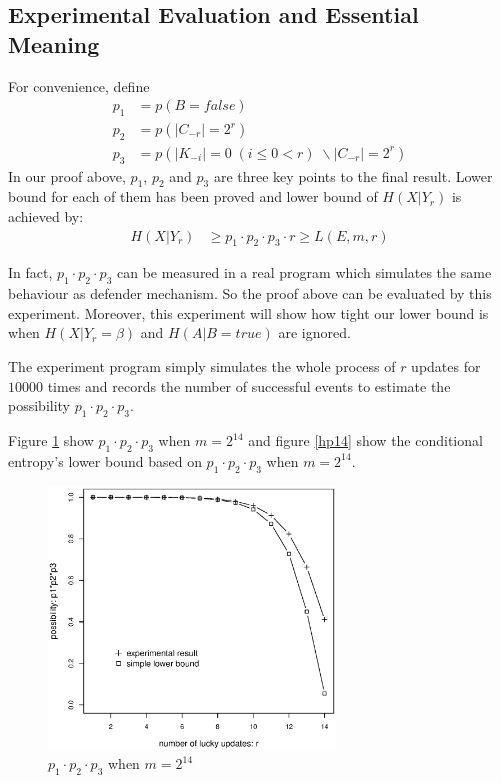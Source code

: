 \documentclass[10pt, conference, compsocconf]{IEEEtran}
\begin{document}
    \subsection{Experimental Evaluation and Essential Meaning}
        For convenience, define
        \begin{align*}
         p_1 &= p(B = false)\\
         p_2 &= p(|C_{-r}| = 2^r)\\
         p_3 &= p(|K_{-i}| = 0 \; (i \leq 0 < r) \; \backslash |C_{-r}| = 2^r)
        \end{align*}
        In our proof above, $p_1$,
        $p_2$ and $p_3$ are
        three key points to the final result.
        Lower bound for each of them has been proved
        and lower bound of $H(X | Y_r)$ is achieved by:
        \begin{align*}
            H(X | Y_r) &\geq p_1 \cdot p_2 \cdot p_3 \cdot r
                \geq L(E, m, r)
        \end{align*}

        In fact, $p_1 \cdot p_2 \cdot p_3$ can be measured in a real program which
        simulates the same behaviour as defender mechanism.
        So the proof above can be evaluated by this experiment.
        Moreover, this experiment will show how tight our lower bound is
        when $H(X | Y_r = \beta)$ and $H(A | B = true)$ are ignored.

        The experiment program simply simulates the whole process of $r$ updates
        for $10000$ times and records the number of successful events
        to estimate the possibility $p_1 \cdot p_2 \cdot p_3$.

        Figure \ref{p14} show $p_1 \cdot p_2 \cdot p_3$
        when $m = 2^{14}$ and figure \ref{hp14} show the conditional entropy's
        lower bound based on $p_1 \cdot p_2 \cdot p_3$ when $m = 2^{14}$.

%
        \begin{figure}[!t]
        \centering
        \includegraphics[width=3in, trim=0mm 0mm 0mm 20mm]{p14.eps}
        \caption{$p_1 \cdot p_2 \cdot p_3$ when $m = 2^{14}$}\label{p14}
        \end{figure}
\end{document}
